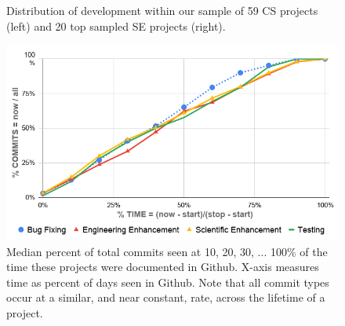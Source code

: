 \documentclass[sigconf]{acmart}
\begin{document}
\begin{figure}[!b]
\begin{center}
 
\end{center}
\caption{Distribution of development within our sample of 59 CS projects (left) and 20 top sampled SE projects (right).}
\label{fig:SE_activities}
\end{figure}

\begin{figure}[!t]
\begin{center}\includegraphics[width=0.9\linewidth]{img/commits_belief1.png}\end{center} 

\caption{Median percent  of total commits seen
at 10, 20, 30, ... 100\% of 
the time these projects were
documented in Github.
X-axis measures time as percent of days seen in Github.
Note
that all commit types occur
at a similar, and near constant,
 rate, across the lifetime of a project.}\label{fig:belief1} 
\vspace{-5mm} 
\end{figure}
\end{document}
